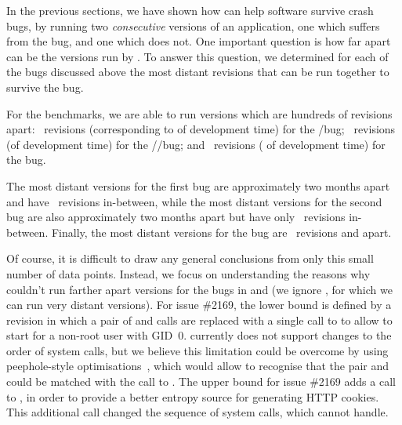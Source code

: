 In the previous sections, we have shown how \mx can help software
survive crash bugs, by running two \textit{consecutive} versions of an
application, one which suffers from the bug, and one which does not.
%
One important question is how far apart can be the versions run
by \mx.  To answer this question, we determined for each of the bugs
discussed above the most distant revisions that can be run together to
survive the bug.  

For the \coreutils benchmarks, we are able to run versions which are
hundreds of revisions apart: \maxDistMdsum~revisions (corresponding to
\timeSpanMdsum of development time) for the \mdsum/\shasum bug; 
\maxDistMkdir~revisions (\timeSpanMkdir of development time) for the 
\mkdir/\mkfifo/\mknod bug; and \maxDistCut~revisions (\timeSpanCut 
of development time) for the \cut bug.

The most distant versions for the first \lighttpd bug are
approximately two months apart and have \maxDistLighttpdOne~revisions
in-between, while the most distant versions for the second
\lighttpd bug are also approximately two months apart but have only
\maxDistLighttpdTwo~revisions in-between.  Finally, the most distant
versions for the \redis bug are \maxDistRedis~revisions
and \timeSpanRedis apart.  

Of course, it is difficult to draw any general conclusions from only
this small number of data points.  Instead, we focus on understanding
the reasons why \mx couldn't run farther apart versions for the bugs
in \lighttpd and \redis (we ignore \coreutils, for which we can run
very distant versions).
%
For \lighttpd issue \#2169, the lower bound is defined by a revision
in which a pair of  and  calls
are replaced with a single call to  to
allow \lighttpd to start for a non-root user with GID~0.  \mx 
currently does not support changes to the order of system calls, but we believe
this limitation could be overcome by using peephole-style
optimisations~\cite{dragon-book}, which would allow \mx to recognise
that the pair  and  could be
matched with the call to .  The upper bound
for \lighttpd issue \#2169 adds a  call to
, in order to provide a better entropy
source for generating HTTP cookies.  This additional 
call changed the sequence of system calls, which \mx cannot
handle. 

